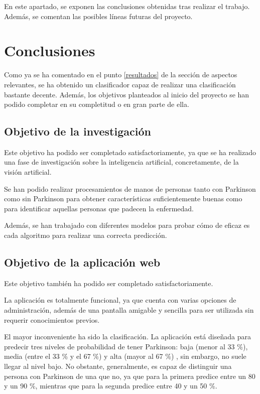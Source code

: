  En este apartado, se exponen las conclusiones obtenidas tras realizar el trabajo. Además, se comentan las posibles líneas futuras del proyecto.
 
 \section{Conclusiones}
 Como ya se ha comentado en el punto \ref{resultados} de la sección de aspectos relevantes, se ha obtenido un clasificador capaz de realizar una clasificación bastante decente. Además, los objetivos planteados al inicio del proyecto se han podido completar en su completitud o en gran parte de ella.
 
 \subsection{Objetivo de la investigación}
 Este objetivo ha podido ser completado satisfactoriamente, ya que se ha realizado una fase de investigación sobre la inteligencia artificial, concretamente, de la visión artificial.
 
 Se han podido realizar procesamientos de manos de personas tanto con Parkinson como sin Parkinson para obtener características suficientemente buenas como para identificar aquellas personas que padecen la enfermedad.
 
 Además, se han trabajado con diferentes modelos para probar cómo de eficaz es cada algoritmo para realizar una correcta predicción.
 
 \subsection{Objetivo de la aplicación web}
 Este objetivo también ha podido ser completado satisfactoriamente.
 
 La aplicación es totalmente funcional, ya que cuenta con varias opciones de administración, además de una pantalla amigable y sencilla para ser utilizada sin requerir conocimientos previos.
 
 El mayor inconveniente ha sido la clasificación. La aplicación está diseñada para predecir tres niveles de probabilidad de tener Parkinson: baja (menor al 33 \%), media (entre el 33 \% y el 67 \%) y alta (mayor al 67 \%) , sin embargo, no suele llegar al nivel bajo. No obstante, generalmente, es capaz de distinguir una persona con Parkinson de una que no, ya que para la primera predice entre un 80 y un 90 \%, mientras que para la segunda predice entre 40 y un 50 \%.
 
